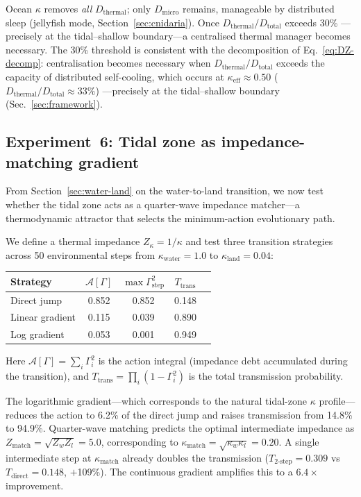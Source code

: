 ﻿\documentclass[aps,pre,twocolumn,superscriptaddress,floatfix]{revtex4-2}
\begin{document}
Ocean $\kappa$ removes \emph{all} $D_{\mathrm{thermal}}$;
only $D_{\mathrm{micro}}$ remains, manageable by distributed
sleep (jellyfish mode, Section~\ref{sec:cnidaria}).
Once $D_{\mathrm{thermal}}/D_{\mathrm{total}}$ exceeds 30\%
---precisely at the tidal--shallow boundary---a centralised
thermal manager becomes necessary.
The 30\% threshold is consistent with the decomposition
of Eq.~\eqref{eq:DZ-decomp}:
centralisation becomes necessary when
$D_{\mathrm{thermal}} / D_{\mathrm{total}}$
exceeds the capacity of distributed self-cooling,
which occurs at $\kappa_{\mathrm{eff}} \approx 0.50$
($D_{\mathrm{thermal}} / D_{\mathrm{total}} \approx 33\%$)
---precisely at the tidal--shallow boundary
(Sec.~\ref{sec:framework}).


\subsection{Experiment~6: Tidal zone as impedance-matching gradient}
\label{sec:exp6}

From Section~\ref{sec:water-land} on the water-to-land
transition, we now test whether the tidal zone acts as a
quarter-wave impedance matcher---a thermodynamic attractor
that selects the minimum-action evolutionary path.

We define a thermal impedance $Z_\kappa = 1/\kappa$ and
test three transition strategies across 50 environmental steps
from $\kappa_{\mathrm{water}} = 1.0$ to
$\kappa_{\mathrm{land}} = 0.04$:

\begin{center}
\begin{tabular}{lcccc}
\hline
Strategy & $\mathcal{A}[\Gamma]$ & $\max\Gamma^2_{\mathrm{step}}$ & $T_{\mathrm{trans}}$ \\
\hline
Direct jump    & 0.852 & 0.852 & 0.148 \\
Linear gradient & 0.115 & 0.039 & 0.890 \\
Log gradient   & 0.053 & 0.001 & 0.949 \\
\hline
\end{tabular}
\end{center}

\noindent
Here $\mathcal{A}[\Gamma] = \sum_i \Gamma_i^2$ is the action
integral (impedance debt accumulated during the transition),
and $T_{\mathrm{trans}} = \prod_i (1 - \Gamma_i^2)$ is the
total transmission probability.

The logarithmic gradient---which corresponds to the natural
tidal-zone $\kappa$ profile---reduces the action to 6.2\%
of the direct jump and raises transmission from 14.8\% to
94.9\%.
Quarter-wave matching predicts the optimal intermediate impedance as
$Z_{\mathrm{match}} = \sqrt{Z_w Z_l} = 5.0$, corresponding to
$\kappa_{\mathrm{match}} = \sqrt{\kappa_w \kappa_l} = 0.20$.
A single intermediate step at $\kappa_{\mathrm{match}}$ already
doubles the transmission ($T_{2\text{-step}} = 0.309$ vs
$T_{\mathrm{direct}} = 0.148$, $+$109\%).
The continuous gradient amplifies this to a $6.4\times$ improvement.
\end{document}
